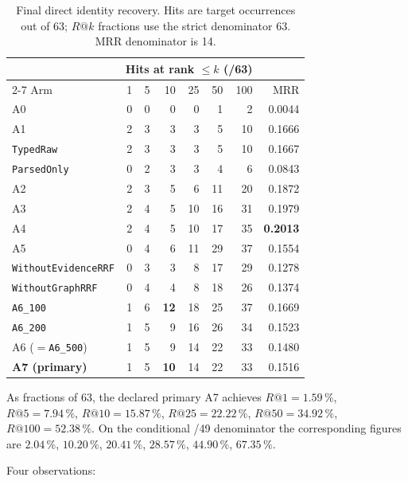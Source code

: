 \documentclass[11pt,a4paper]{article}
\begin{document}
\begin{table}[htbp]
\centering
\small
\caption{Final direct identity recovery. Hits are target occurrences out of 63; $R@k$ fractions use the
strict denominator 63. MRR denominator is 14.}
\label{tab:final}
\begin{tabular}{lrrrrrrr}
\toprule
& \multicolumn{6}{c}{Hits at rank $\le k$ (/63)} & \\
\cmidrule(lr){2-7}
Arm & 1 & 5 & 10 & 25 & 50 & 100 & MRR \\
\midrule
A0                          & 0 & 0 &  0 &  0 &  1 &  2 & 0.0044 \\
A1                          & 2 & 3 &  3 &  3 &  5 & 10 & 0.1666 \\
\texttt{TypedRaw}           & 2 & 3 &  3 &  3 &  5 & 10 & 0.1667 \\
\texttt{ParsedOnly}         & 0 & 2 &  3 &  3 &  4 &  6 & 0.0843 \\
A2                          & 2 & 3 &  5 &  6 & 11 & 20 & 0.1872 \\
A3                          & 2 & 4 &  5 & 10 & 16 & 31 & 0.1979 \\
A4                          & 2 & 4 &  5 & 10 & 17 & 35 & \textbf{0.2013} \\
A5                          & 0 & 4 &  6 & 11 & 29 & 37 & 0.1554 \\
\texttt{WithoutEvidenceRRF} & 0 & 3 &  3 &  8 & 17 & 29 & 0.1278 \\
\texttt{WithoutGraphRRF}    & 0 & 4 &  4 &  8 & 18 & 26 & 0.1374 \\
\texttt{A6\_100}            & 1 & 6 & \textbf{12} & 18 & 25 & 37 & 0.1669 \\
\texttt{A6\_200}            & 1 & 5 &  9 & 16 & 26 & 34 & 0.1523 \\
A6 ($=$\texttt{A6\_500})    & 1 & 5 &  9 & 14 & 22 & 33 & 0.1480 \\
\textbf{A7 (primary)}       & 1 & 5 & \textbf{10} & 14 & 22 & 33 & 0.1516 \\
\bottomrule
\end{tabular}
\end{table}

As fractions of 63, the declared primary A7 achieves $R@1 = 1.59\,\%$, $R@5 = 7.94\,\%$,
$R@10 = 15.87\,\%$, $R@25 = 22.22\,\%$, $R@50 = 34.92\,\%$, $R@100 = 52.38\,\%$. On the conditional /49
denominator the corresponding figures are $2.04\,\%$, $10.20\,\%$, $20.41\,\%$, $28.57\,\%$, $44.90\,\%$,
$67.35\,\%$.

Four observations:
\end{document}
